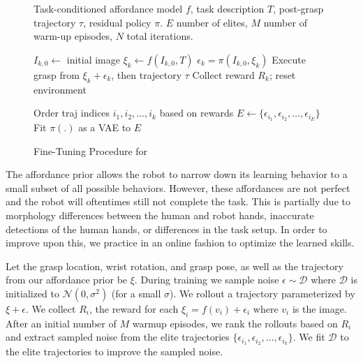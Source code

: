 \begin{figure}
\vspace{-0.3in}
\begin{minipage}{\linewidth}
\begin{algorithm}[H]
\caption{Fine-Tuning Procedure for \ours}\label{alg:cap}
\begin{algorithmic}
\small
\REQUIRE Task-conditioned affordance model $f$, task description $T$, post-grasp trajectory $\tau$, residual policy $\pi$. $E$ number of elites, $M$ number of warm-up episodes, $N$ total iterations. 

    \STATE $I_{k, 0} \gets $ initial image
    \STATE $\xi_k \gets f(I_{k, 0}, T)$
    \STATE $\epsilon_k = \pi(I_{k, 0}, \xi_k)$
    \STATE Execute grasp from $\xi_k + \epsilon_k$, then trajectory $\tau$
    \STATE Collect reward $R_k$; reset environment

        \STATE Order traj indices $i_1, i_2, \dots, i_k$ based on rewards
        \STATE $E \gets \{ \epsilon_{i_1}, \epsilon_{i_2}, \dots, \epsilon_{i_E} \} $
        \STATE Fit $\pi(.)$ as a VAE to $E$
    \ENDIF
\ENDFOR

\end{algorithmic}
\label{algo:finetune}

\end{algorithm}
\end{minipage}
\end{figure}


The affordance prior allows the robot to narrow down its learning behavior to a small subset of all possible behaviors. However, these affordances are not perfect and the robot will oftentimes still not complete the task.  This is partially due to morphology differences between the human and robot hands, inaccurate detections of the human hands, or differences in the task setup. In order to improve upon this, we practice in an online fashion to optimize the learned skills. 

Let the grasp location, wrist rotation, and grasp pose, as well as the trajectory from our affordance prior be $\xi$. During training we sample noise $\epsilon \sim \mathcal{D}$ where $\mathcal{D}$ is initialized to $\mathcal{N}(0, \sigma^2)$ (for a small $\sigma$). We rollout a trajectory parameterized by $\xi + \epsilon$. We collect $R_i$, the reward for each $\xi_i = f(v_i) + \epsilon_i$ where $v_i$ is the image.  After an initial number of $M$ warmup episodes, we rank the rollouts based on $R_i$ and extract sampled noise from the elite trajectories $\{ \epsilon_{i_1}, \epsilon_{i_2}, \dots, \epsilon_{i_k} \}$. We fit $\mathcal{D}$ to the elite trajectories to improve the sampled noise. 


